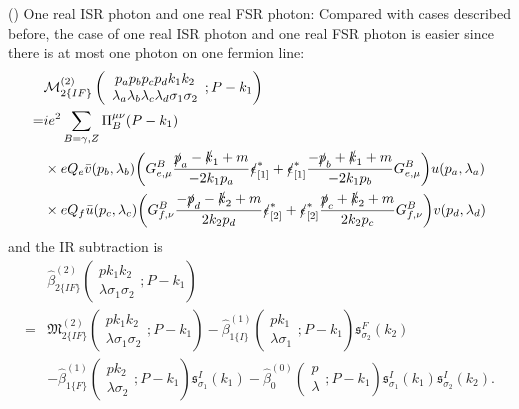 () One real ISR photon and one real FSR photon:
Compared with cases described before, the case of one real ISR photon and one real FSR photon is easier since there is at most one photon on one fermion line:
\begin{align}
&\mathcal{M}^{(2)}_{2\{IF\}}\left(\begin{array}{c}
p_ap_bp_cp_dk_1k_2\\\lambda_a\lambda_b\lambda_c\lambda_d\sigma_1\sigma_2
\end{array};P-k_1\right)\nonumber\\
=&ie^2\sum_{B=\gamma,Z}\Pi^{\mu\nu}_B(P-k_1)\nonumber\\
&\times eQ_e\bar{v}(p_b,\lambda_b)\biggl( G^B_{e,\mu}\frac{\slashed p_a-\slashed k_1+m}{-2k_1p_a}\slashed\epsilon^\ast_{[1]}
+\slashed\epsilon^\ast_{[1]}\frac{-\slashed p_b+\slashed k_1+m}{-2k_1p_b}G^B_{e,\mu}\biggr)u(p_a,\lambda_a)\nonumber\\
&\times eQ_f\bar{u}(p_c,\lambda_c)\biggl( G^B_{f,\nu}\frac{-\slashed p_d-\slashed k_2+m}{2k_2p_d}\slashed\epsilon^\ast_{[2]}
+\slashed\epsilon^\ast_{[2]}\frac{\slashed p_c+\slashed k_2+m}{2k_2p_c}G^B_{f,\nu}\biggr)v(p_d,\lambda_d)\nonumber\\
\end{align}
and the IR subtraction is 
\begin{align}
&\hat{\beta}^{(2)}_{2\{IF\}}\left(\begin{array}{c}
pk_1k_2\\\lambda\sigma_1\sigma_2
\end{array};P-k_1\right)\nonumber\\
=&\mathfrak{M}^{(2)}_{2\{IF\}}\left(\begin{array}{c}
pk_1k_2\\\lambda\sigma_1\sigma_2
\end{array};P-k_1\right)-\hat{\beta}^{(1)}_{1\{I\}}\left(\begin{array}{c}
pk_1\\\lambda\sigma_1
\end{array};P-k_1\right)\mathfrak{s}^{F}_{\sigma_2}(k_2)\nonumber\\
&-\hat{\beta}^{(1)}_{1\{F\}}\left(\begin{array}{c}
pk_2\\\lambda\sigma_2
\end{array};P-k_1\right)\mathfrak{s}^{I}_{\sigma_1}(k_1)-\hat{\beta}^{(0)}_{0}\left(\begin{array}{c}
p\\\lambda
\end{array};P-k_1\right)\mathfrak{s}^{I}_{\sigma_1}(k_1)\mathfrak{s}^{I}_{\sigma_2}(k_2).\nonumber\\
\end{align}
